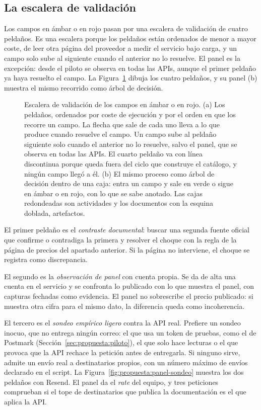 \subsection{La escalera de validación}
\label{sec:propuesta:validacion}

Los campos en ámbar o en rojo pasan por una escalera de validación de cuatro peldaños.
Es una escalera porque los peldaños están ordenados de menor a mayor coste, de leer otra página del proveedor a medir el servicio bajo carga, y un campo solo sube al siguiente cuando el anterior no lo resuelve.
El panel es la excepción: desde el piloto se observa en todas las APIs, aunque el primer peldaño ya haya resuelto el campo.
La Figura~\ref{fig:propuesta:escalera} dibuja los cuatro peldaños, y su panel (b) muestra el mismo recorrido como árbol de decisión.

\begin{figure}[tbp]
\centering

\caption[Escalera de validación]{Escalera de validación de los campos en ámbar o en rojo. (a) Los peldaños, ordenados por coste de ejecución y por el orden en que los recorre un campo. La flecha que sale de cada uno lleva a lo que produce cuando resuelve el campo. Un campo sube al peldaño siguiente solo cuando el anterior no lo resuelve, salvo el panel, que se observa en todas las APIs. El cuarto peldaño va con línea discontinua porque queda fuera del ciclo que construye el catálogo, y ningún campo llegó a él. (b) El mismo proceso como árbol de decisión dentro de una caja: entra un campo y sale en verde o sigue en ámbar o en rojo, con lo que se sabe anotado. Las cajas redondeadas son actividades y los documentos con la esquina doblada, artefactos.}
\label{fig:propuesta:escalera}
\end{figure}

El primer peldaño es el \textit{contraste documental}: buscar una segunda fuente oficial que confirme o contradiga la primera y resolver el choque con la regla de la página de precios del apartado anterior.
Si la página no interviene, el choque se registra como discrepancia.

El segundo es la \textit{observación de panel} con cuenta propia.
Se da de alta una cuenta en el servicio y se confronta lo publicado con lo que muestra el panel, con capturas fechadas como evidencia.
El panel no sobrescribe el precio publicado: si muestra otra cifra para el mismo dato, la diferencia queda como incoherencia.

El tercero es el \textit{sondeo empírico ligero} contra la API real.
Prefiere un sondeo inocuo, que no entrega ningún correo: el que usa un token de pruebas, como el de Postmark (Sección~\ref{sec:propuesta:piloto}), el que solo hace lecturas o el que provoca que la API rechace la petición antes de entregarla.
Si ninguno sirve, admite un envío real a destinatarios propios, con un número máximo de envíos declarado en el script.
La Figura~\ref{fig:propuesta:panel-sondeo} muestra los dos peldaños con Resend.
El panel da el \textit{rate} del equipo, y tres peticiones comprueban si el tope de destinatarios que publica la documentación es el que aplica la API.

